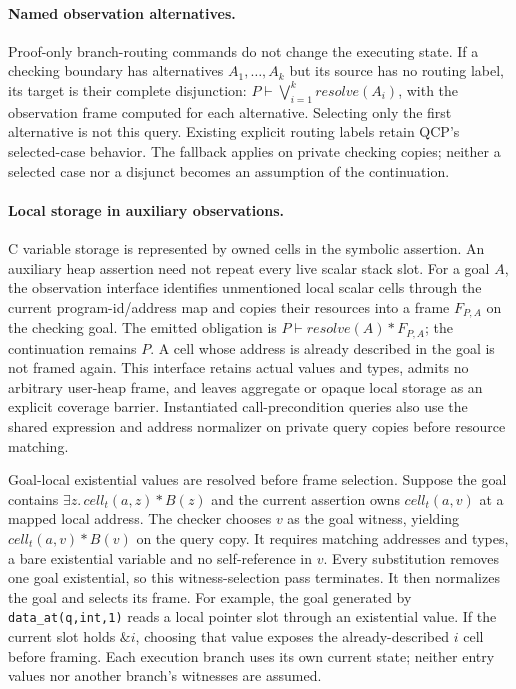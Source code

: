 \paragraph{Named observation alternatives.}
Proof-only branch-routing commands do not change the executing state. If a
checking boundary has alternatives $A_1,\ldots,A_k$ but its source has no
routing label, its target is their complete disjunction:
$P\vdash\bigvee_{i=1}^{k}\mathit{resolve}(A_i)$, with the observation frame
computed for each alternative. Selecting only the first alternative is not
this query. Existing explicit routing labels retain QCP's selected-case
behavior. The fallback applies on private checking copies; neither a selected
case nor a disjunct becomes an assumption of the continuation.

\paragraph{Local storage in auxiliary observations.}
C variable storage is represented by owned cells in the symbolic assertion.
An auxiliary heap assertion need not repeat every live scalar stack slot.
For a goal $A$, the observation interface identifies unmentioned local scalar
cells through the current program-id/address map and copies their resources
into a frame $F_{P,A}$ on the checking goal. The emitted obligation is
$P\vdash\mathit{resolve}(A)*F_{P,A}$; the continuation remains $P$.
A cell whose address is already described in the goal is not framed again.
This interface retains actual values and types, admits no arbitrary user-heap
frame, and leaves aggregate or opaque local storage as an explicit coverage
barrier. Instantiated call-precondition queries also use the shared expression
and address normalizer on private query copies before resource matching.

Goal-local existential values are resolved before frame selection. Suppose the
goal contains $\exists z.\,\mathit{cell}_t(a,z)*B(z)$ and the current assertion
owns $\mathit{cell}_t(a,v)$ at a mapped local address. The checker chooses $v$
as the goal witness, yielding $\mathit{cell}_t(a,v)*B(v)$ on the query copy.
It requires matching addresses and types, a bare existential variable and no
self-reference in $v$. Every substitution removes one goal existential, so
this witness-selection pass terminates. It then normalizes the goal and
selects its frame. For example, the goal generated by
\texttt{data\_at(q,int,1)} reads a local pointer slot through an existential
value. If the current slot holds $\&i$, choosing that value exposes the
already-described $i$ cell before framing. Each execution branch uses its own
current state; neither entry values nor another branch's witnesses are assumed.


